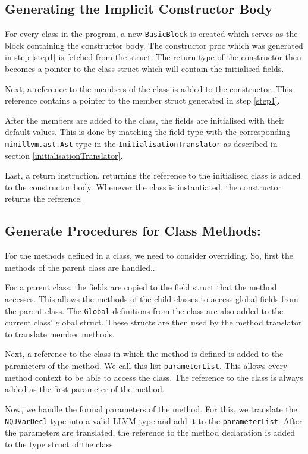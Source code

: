 \documentclass[]{tukportfolio}
\begin{document}
	\subsection{Generating the Implicit Constructor Body} 
	
	For every class in the program, a new \lstinline|BasicBlock| is created which serves as the block containing the constructor body. The constructor proc which was generated in step \ref{step1} is fetched from the struct. The return type of the constructor then becomes a pointer to the class struct which will contain the  initialised fields.
	
	Next, a reference to the members of the class is added to the constructor. This reference contains a pointer to the member struct generated in step \ref{step1}. 
	
	After the members are added to the class, the fields are initialised with their default values. This is done by matching the field type with the corresponding \lstinline|minillvm.ast.Ast| type in the \lstinline|InitialisationTranslator| as described in section \ref{initialisationTranslator}. 
	
	Last, a return instruction, returning the reference to the initialised class is added to the constructor body. Whenever the class is instantiated, the constructor returns the reference.
	
	\subsection{Generate Procedures for Class Methods:}
	
	For the methods defined in a class, we need to consider overriding. So, first the methods of the parent class are handled.. 
	
	For a parent class, the fields are copied to the field struct that the method accesses. This allows the methods of the child classes to access global fields from the parent class. The \lstinline|Global| definitions from the class are also added to the current class' global struct. These structs are then used by the method translator to translate member methods.
	
	Next, a reference to the class in which the method is defined is added to the parameters of the method. We call this list \lstinline|parameterList|. This allows every method context to be able to access the class. The reference to the class is always added as the first parameter of the method. 
	
	Now, we handle the formal parameters of the method. For this, we translate the \lstinline|NQJVarDecl| type into a valid LLVM type and add it to the \lstinline|parameterList|. After the parameters are translated, the reference to the method declaration is added to the type struct of the class.
	
\end{document}

